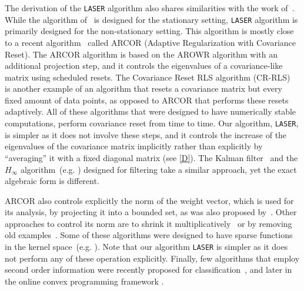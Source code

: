 The derivation of the \texttt{LASER} algorithm also shares similarities with the work of~\cite{Forster}. While the algorithm of~\cite{Forster} is
designed for the stationary setting, \texttt{LASER} algorithm is primarily designed
for the non-stationary setting. This algorithm is mostly close to a recent
algorithm~\citep{VaitsCr11} called ARCOR (Adaptive Regularization with Covariance Reset). The ARCOR algorithm
is based on the AROWR algorithm with an additional projection step, and
it controls the eigenvalues of a covariance-like matrix using scheduled resets.  The Covariance Reset RLS algorithm
(CR-RLS)~\citep{Chen,Salgado,Goodhart}
is another example of an
algorithm that resets a covariance matrix but every fixed amount of
data points, as opposed to ARCOR that performs these resets adaptively.  All
of these algorithms that were designed to have numerically stable computations, perform
covariance reset from time to time. Our algorithm, \texttt{LASER}, is simpler
as it does not involve these steps, and it controls the increase of the
eigenvalues of the covariance matrix implicitly rather
than explicitly by ``averaging'' it with a fixed diagonal matrix (see
\eqref{D}). The Kalman filter~\citep{Kalman60}
and the $H_\infty$
algorithm~(e.g. \citep{Simon:2006:OSE:1146304}) %
designed for filtering take a similar approach, yet the exact algebraic
form is different.

ARCOR also controls explicitly the norm of the weight vector, which is
used for its analysis, by projecting it into a bounded set, as was
also proposed by~\cite{HerbsterW01}. Other approaches to control its
norm are to shrink it multiplicatively~\citep{KivinenSW01} or by removing old
examples~\citep{CavallantiCG07}. Some of these algorithms were
designed to have sparse functions in the kernel space~(e.g.
\citep{CrammerKS03,Dekel05theforgetron}). Note that our algorithm
\texttt{LASER} is simpler as it does not
perform any of these operation explicitly.
%
Finally, few algorithms that employ second order information
were recently proposed for
classification~\citep{CesaBianchiCoGe05,CrammerKuDr09,Crammer:2012:CLC:2343676.2343704}, %
and later in the online convex programming framework
\citep{DuchiHS10,McMahanS10}.
